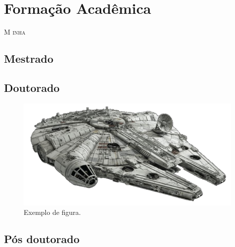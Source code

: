 \chapter{Formação Acadêmica}

%
	
\lettrine[lines=2, lhang=0.33, loversize=0.25, findent=1.5em]{M}{ inha} \lipsum[17]


\section{Mestrado}
\lipsum[18]

\lipsum[19]

\lipsum[20]

\lipsum[21]

\lipsum[22]



\section{Doutorado}

\lipsum[23]

\lipsum[24]

\lipsum[25]

\lipsum[26]

\lipsum[27]

\begin{figure}
	\centering
		\includegraphics[width=0.99\textwidth,angle=-0]{Figuras/starwars_1.pdf}
		\caption[Linha do tempo pré FURG]{{\footnotesize Exemplo de figura.}}
		\label{fig:gantt2}
\end{figure}


\lipsum[28]

\lipsum[29]

\lipsum[30]

\lipsum[31]

\lipsum[32]

\section{Pós doutorado}

\lipsum[33]

\lipsum[34]






